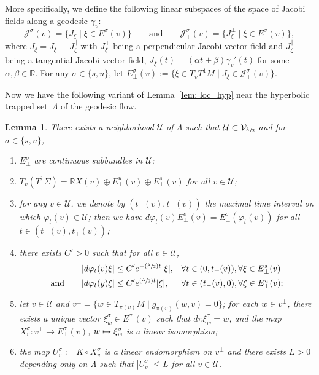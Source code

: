 \documentclass[JEP,XML,SOM,Unicode,NoFloatCountersInSection]{cedram}
\newcommand\mto{\mathchoice{\longmapsto}{\mapsto}{\mapsto}{\mapsto}}
\newcommand{\Psfrac}[2]{(\sfrac{#1}{#2})}
\let\sep\mid
\newtheorem{lemma}[theorem]{Lemma}
\theoremstyle{definition}
\let\phi\varphi
\renewcommand{\>}{{\rangle}}
\newcommand{\<}{{\langle}}
\begin{document}
More specifically, we define the following linear subspaces of the space of Jacobi fields along a geodesic $\gamma_v$:
\begin{equation*}
\mathcal J^{\sigma}(v) = \{J_\xi\sep \xi\in E^{\sigma}(v)\} \qquad\text{and} \qquad \mathcal J_{\bot}^{\sigma}(v) = \{J^{\bot}_\xi\sep \xi\in E^{\sigma}(v)\},
\end{equation*}
where $J_{\xi}=J^{\bot}_{\xi}+J^{\parallel}_{\xi}$ with $J^{\bot}_{\xi}$ being a perpendicular Jacobi vector field and $J^{\parallel}_{\xi}$ being a tangential Jacobi vector field, \ie $J^{\parallel}_{\xi}(t)=(\alpha t+\beta)\gamma_v'(t)$ for some $\alpha,\beta\in\mathbb R$. For any $\sigma\in\{s, u\}$, let $E^{\sigma}_{\bot}(v) := \{\xi\in T_vT^1M\sep  J_{\xi}\in\mathcal J^{\sigma}_{\bot}(v)\}$.

Now we have the following variant of Lemma~\ref{lem: loc_hyp} near the hyperbolic trapped set~$\Lambda$ of the geodesic flow.

\begin{lemma}\label{lem: perp_component}
There exists a neighborhood $\mathcal U$ of $\Lambda$ such that $\mathcal U\subset \mathcal V_{\sfrac{\lambda}{2}}$ and for $\sigma\in\{s, u\}$,
\begin{enumerate}
\item\label{cont_inv_bundle} $E^{\sigma}_{\bot}$ are continuous subbundles in $\mathcal U$;
\item $T_v(T^1\Sigma) = \mathbb RX(v)\oplus E^u_{\bot}(v)\oplus E^s_{\bot}(v)$ for all $v\in\mathcal U$;
\item for any $v\in\mathcal U$, we denote by $(t_{-}(v), t_{+}(v))$ the maximal time interval on which $\phi_t(v)\in \mathcal U$; then we have $d\phi_t(v)E_{\bot}^{\sigma}(v)=E^{\sigma}_{\bot}(\phi_t(v))$ for all $t\in(t_-(v),t_+(v))$;
\item\label{rate_for_perp} there exists $C'>0$ such that for all $v\in\mathcal U$,
\[
\begin{aligned}
|d\phi_t(v)\xi|&\leq C'e^{-\Psfrac{\lambda}{2}t}|\xi|, && \forall t\in(0,t_+(v)), \forall \xi\in E^s_{\perp}(v)\\
\text{and} \qquad |d\phi_t(y)\xi|&\leq C'e^{\Psfrac{\lambda}{2}t}|\xi|, && \forall t\in(t_-(v),0), \forall \xi\in E^u_{\perp}(v);
\end{aligned}
\]
\item\label{linear_isom} let $v\in \mathcal U$ and $v^{\bot} = \{w\in T_{\pi(v)}M\sep g_{\pi(v)}(w,v)=0\}$; for each $w\in v^{\bot}$, there exists a unique vector $\xi^{\sigma}_{w}\in E^{\sigma}_{\bot}(v)$ such that $d\pi\xi^{\sigma}_w=w$, and the map $X^{\sigma}_v: v^{\bot}\to E^{\sigma}_{\bot}(v)$, $w\mto \xi^{\sigma}_w$ is a linear isomorphism;

\item\label{norm_bound_in_U} the map $U^{\sigma}_v:=K\circ X^{\sigma}_v$ is a linear endomorphism on $v^{\bot}$ and there exists $L>0$ depending only on $\Lambda$ such that $|U^{\sigma}_v|\leq L$ for all $v\in \mathcal U$.
\end{enumerate}
\end{lemma}
\end{document}
